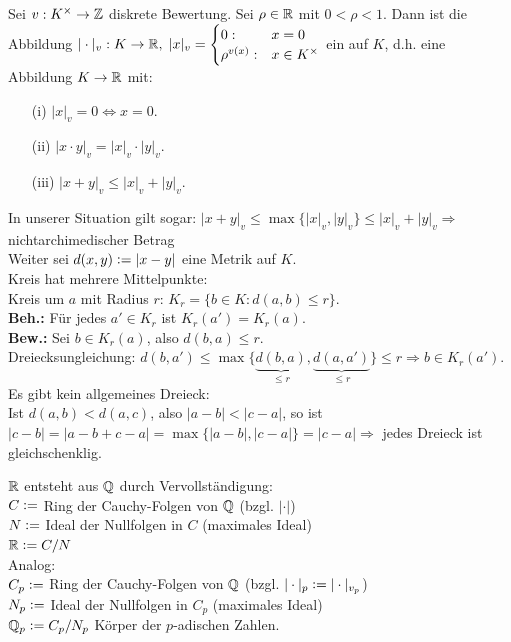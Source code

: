 \documentclass[a4paper, 10pt]{report}
\begin{document}
\begin{Bem} 
Sei $v: K^{\times} \to \mathbb{Z}$ diskrete Bewertung.
Sei $\rho \in \mathbb{R}$ mit $0 < \rho < 1$.
Dann ist die Abbildung $|\cdot|_v: K \to \mathbb{R}, \; |x|_v = \begin{cases}0: & x
= 0 \\\rho^{v(x)}: & x \in K^{\times}\end{cases}$ ein
 auf $K$, d.h. eine Abbildung $K \to
\mathbb{R}$ mit:
\begin{enumerate}
  \item[(i)] $|x|_v = 0 \Leftrightarrow x = 0$.
  \item[(ii)] $|x \cdot y|_v = |x|_v \cdot |y|_v$.
  \item[(iii)] $|x + y|_v \leq |x|_v + |y|_v$.
\end{enumerate}
In unserer Situation gilt sogar: $|x + y|_v \leq \max\{|x|_v,|y|_v\} \leq |x|_v
+ |y|_v \Rightarrow$ \glqq nichtarchimedischer Betrag\grqq\\
Weiter sei $d(x,y) \mathrel{\mathop:}=|x - y|$ eine Metrik auf $K$.\\
Kreis hat mehrere Mittelpunkte:\\
Kreis um $a$ mit Radius $r$: $K_r = \{b \in K: d(a,b) \leq r\}$.\\
\textbf{Beh.:} Für jedes $a' \in K_r$ ist $K_r(a') = K_r(a)$.\\
\textbf{Bew.:} Sei $b \in K_r(a)$, also $d(b,a) \leq r$.\\
Dreiecksungleichung: $d(b,a') \leq \max\{\underset{\leq
r}{\underbrace{d(b,a)}},\underset{\leq r}{\underbrace{d(a,a')}}\} \leq r \Rightarrow b \in
K_r(a')$.\\
Es gibt kein allgemeines Dreieck:\\
Ist $d(a,b) < d(a,c)$, also $|a-b| < |c-a|$, so ist $|c-b| = |a-b+c-a| =
\max\{|a-b|,|c-a|\} = |c-a| \Rightarrow$ jedes Dreieck ist gleichschenklig.
\end{Bem}

\begin{Eri}
$\mathbb{R}$ entsteht aus $\mathbb{Q}$ durch \glqq Vervollständigung\grqq:\\
$C \mathrel{\mathop:}=$ Ring der Cauchy-Folgen von $\mathbb{Q}$ (bzgl. $|\cdot|$)\\
$N \mathrel{\mathop:}=$ Ideal der Nullfolgen in $C$ (maximales Ideal)\\
$\mathbb{R} \mathrel{\mathop:}= C/N$\\
Analog:\\
$C_p \mathrel{\mathop:}=$ Ring der Cauchy-Folgen von $\mathbb{Q}$ (bzgl. $|\cdot|_p \mathrel{\mathop:}=
|\cdot|_{v_p}$)\\
$N_p \mathrel{\mathop:}=$ Ideal der Nullfolgen in $C_p$ (maximales Ideal)\\
$\mathbb{Q}_p \mathrel{\mathop:}= C_p/N_p$ \glqq Körper der $p$-adischen Zahlen\grqq.
\end{Eri}
\end{document}
